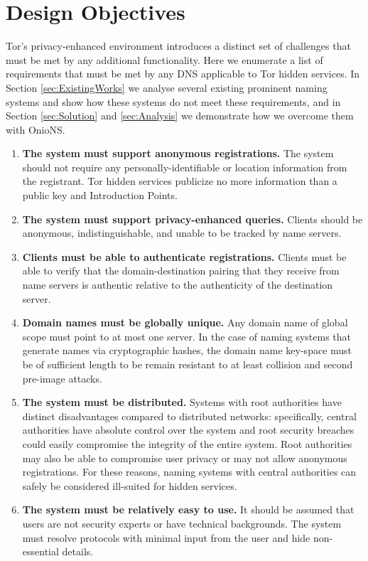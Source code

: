 \documentclass{sig-alternate}
\begin{document}
\section{Design Objectives} %

Tor's privacy-enhanced environment introduces a distinct set of challenges that must be met by any additional functionality. Here we enumerate a list of requirements that must be met by any DNS applicable to Tor hidden services. In Section \ref{sec:ExistingWorks} we analyse several existing prominent naming systems and show how these systems do not meet these requirements, and in Section \ref{sec:Solution} and \ref{sec:Analysis} we demonstrate how we overcome them with OnioNS.

\begin{enumerate}[noitemsep]
	\item \textbf{The system must support anonymous registrations.} The system should not require any personally-identifiable or location information from the registrant. Tor hidden services publicize no more information than a public key and Introduction Points.
	\item \textbf{The system must support privacy-enhanced queries.} Clients should be anonymous, indistinguishable, and unable to be tracked by name servers.
	\item \textbf{Clients must be able to authenticate registrations.} Clients must be able to verify that the domain-destination pairing that they receive from name servers is authentic relative to the authenticity of the destination server.
	\item \textbf{Domain names must be globally unique.} Any domain name of global scope must point to at most one server. In the case of naming systems that generate names via cryptographic hashes, the domain name key-space must be of sufficient length to be remain resistant to at least collision and second pre-image attacks.
	\item \textbf{The system must be distributed.} Systems with root authorities have distinct disadvantages compared to distributed networks: specifically, central authorities have absolute control over the system and root security breaches could easily compromise the integrity of the entire system. Root authorities may also be able to compromise user privacy or may not allow anonymous registrations. For these reasons, naming systems with central authorities can safely be considered ill-suited for hidden services.
	\item \textbf{The system must be relatively easy to use.} It should be assumed that users are not security experts or have technical backgrounds. The system must resolve protocols with minimal input from the user and hide non-essential details.

\end{enumerate}
\end{document}
